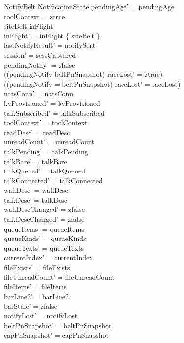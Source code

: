 \documentclass[a4paper,10pt,fleqn]{article}
\begin{document}
\begin{schema}{NotifyBelt}
  \Delta NotificationState
  \where
  pendingAge' = pendingAge \\
  toolContext = ztrue \\
  siteBelt \in inFlight \\
  inFlight' = inFlight \setminus \{ siteBelt \} \\
  lastNotifyResult' = notifySent \\
  session' = sessCaptured \\
  pendingNotify' = zfalse \\
  ((pendingNotify \neq beltPnSnapshot) \implies raceLost' = ztrue) \\
  ((pendingNotify = beltPnSnapshot) \implies raceLost' = raceLost) \\
  natsConn' = natsConn \\
  kvProvisioned' = kvProvisioned \\
  talkSubscribed' = talkSubscribed \\
  toolContext' = toolContext \\
  readDesc' = readDesc \\
  unreadCount' = unreadCount \\
  talkPending' = talkPending \\
  talkBare' = talkBare \\
  talkQueued' = talkQueued \\
  talkConnected' = talkConnected \\
  wallDesc' = wallDesc \\
  talkDesc' = talkDesc \\
  wallDescChanged' = zfalse \\
  talkDescChanged' = zfalse \\
  queueItems' = queueItems \\
  queueKinds' = queueKinds \\
  queueTexts' = queueTexts \\
  currentIndex' = currentIndex \\
  fileExists' = fileExists \\
  fileUnreadCount' = fileUnreadCount \\
  fileItems' = fileItems \\
  barLine2' = barLine2 \\
  barStale' = zfalse \\
  notifyLost' = notifyLost \\
  beltPnSnapshot' = beltPnSnapshot \\
  capPnSnapshot' = capPnSnapshot \\

\end{schema}
\end{document}
